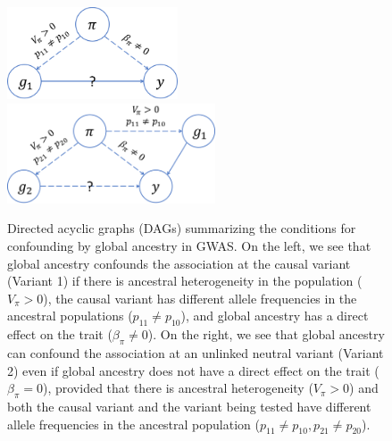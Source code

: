 \documentclass[12pt]{article}
\begin{document}
\begin{figure}
\includegraphics[width=0.45\textwidth]{figs/confounding_dags/dag_gwas_1_v2.png}\hspace{0.1in}
\includegraphics[width=0.55\textwidth]{figs/confounding_dags/dag_gwas_2_v2.png}
\caption{Directed acyclic graphs (DAGs) summarizing the conditions for confounding by global ancestry in GWAS. On the left, we see that global ancestry confounds the association at the causal variant (Variant 1) if there is ancestral heterogeneity in the population ($V_\pi > 0$), the causal variant has different allele frequencies in the ancestral populations ($p_{11} \neq p_{10}$), and global ancestry has a direct effect on the trait ($\beta_\pi \neq 0$). On the right, we see that global ancestry can confound the association at an unlinked neutral variant (Variant 2) even if global ancestry does not have a direct effect on the trait ($\beta_\pi = 0$), provided that there is ancestral heterogeneity ($V_\pi > 0$) and both the causal variant and the variant being tested have different allele frequencies in the ancestral population ($p_{11} \neq p_{10}, p_{21} \neq p_{20}$).}
\label{fig:confoundingdags}
\end{figure}
\end{document}
